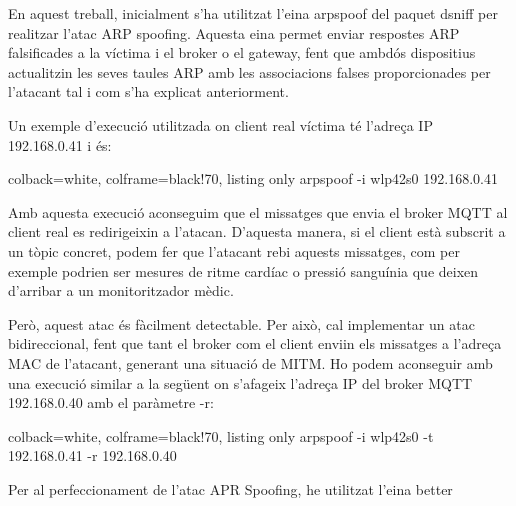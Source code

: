 En aquest treball, inicialment s'ha utilitzat l'eina arpspoof del paquet dsniff per realitzar l'atac ARP spoofing. Aquesta eina permet enviar respostes ARP falsificades a la víctima i el broker o el gateway, fent que ambdós dispositius actualitzin les seves taules ARP amb les associacions falses proporcionades per l'atacant tal i com s'ha explicat anteriorment.

Un exemple d'execució utilitzada on client real víctima té l'adreça IP 192.168.0.41 i és:

\begin{tcblisting}{colback=white, colframe=black!70, listing only}
    arpspoof -i wlp42s0 192.168.0.41
\end{tcblisting}

Amb aquesta execució aconseguim que el missatges que envia el broker MQTT al client real es redirigeixin a l'atacan. D'aquesta manera, si el client està subscrit a un tòpic concret, podem fer que l'atacant rebi aquests missatges, com per exemple podrien ser mesures de ritme cardíac o pressió sanguínia que deixen d'arribar a un monitoritzador mèdic. 

Però, aquest atac és fàcilment detectable. Per això, cal implementar un atac bidireccional, fent que tant el broker com el client enviin els missatges a l'adreça MAC de l'atacant, generant una situació de MITM. Ho podem aconseguir amb una execució similar a la següent on s'afageix l'adreça IP del broker MQTT 192.168.0.40 amb el paràmetre -r:

\begin{tcblisting}{colback=white, colframe=black!70, listing only}
    arpspoof -i wlp42s0 -t 192.168.0.41 -r 192.168.0.40
\end{tcblisting}

Per al perfeccionament de l'atac APR Spoofing, he utilitzat l'eina better